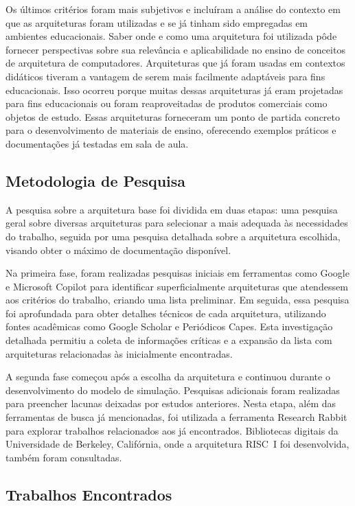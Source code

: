 \documentclass[
	12pt,				%
	openright,			%
	oneside,			%
	a4paper,			%
	english,			%
	french,				%
	spanish,			%
	brazil,				%
	]{abntex2}
\begin{document}
Os últimos critérios foram mais subjetivos e incluíram a análise do contexto em que as arquiteturas foram utilizadas e se já tinham sido empregadas em ambientes educacionais. Saber onde e como uma arquitetura foi utilizada pôde fornecer perspectivas sobre sua relevância e aplicabilidade no ensino de conceitos de arquitetura de computadores. Arquiteturas que já foram usadas em contextos didáticos tiveram a vantagem de serem mais facilmente adaptáveis para fins educacionais. Isso ocorreu porque muitas dessas arquiteturas já eram projetadas para fins educacionais ou foram reaproveitadas de produtos comerciais como objetos de estudo. Essas arquiteturas forneceram um ponto de partida concreto para o desenvolvimento de materiais de ensino, oferecendo exemplos práticos e documentações já testadas em sala de aula.

\subsection{Metodologia de Pesquisa}

A pesquisa sobre a arquitetura base foi dividida em duas etapas: uma pesquisa geral sobre diversas arquiteturas para selecionar a mais adequada às necessidades do trabalho, seguida por uma pesquisa detalhada sobre a arquitetura escolhida, visando obter o máximo de documentação disponível.

Na primeira fase, foram realizadas pesquisas iniciais em ferramentas como Google e Microsoft Copilot para identificar superficialmente arquiteturas que atendessem aos critérios do trabalho, criando uma lista preliminar. Em seguida, essa pesquisa foi aprofundada para obter detalhes técnicos de cada arquitetura, utilizando fontes acadêmicas como Google Scholar e Periódicos Capes. Esta investigação detalhada permitiu a coleta de informações críticas e a expansão da lista com arquiteturas relacionadas às inicialmente encontradas.

A segunda fase começou após a escolha da arquitetura e continuou durante o desenvolvimento do modelo de simulação. Pesquisas adicionais foram realizadas para preencher lacunas deixadas por estudos anteriores. Nesta etapa, além das ferramentas de busca já mencionadas, foi utilizada a ferramenta Research Rabbit para explorar trabalhos relacionados aos já encontrados. Bibliotecas digitais da Universidade de Berkeley, Califórnia, onde a arquitetura RISC~I foi desenvolvida, também foram consultadas.

\subsection{Trabalhos Encontrados}
\end{document}
